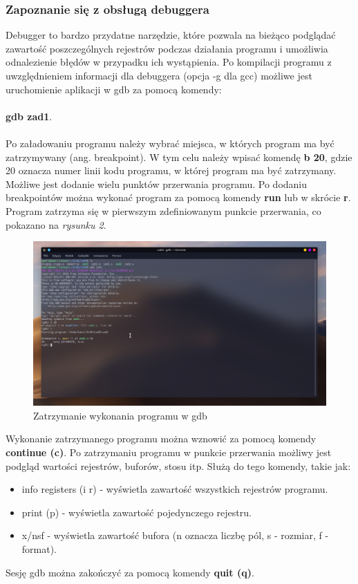 \documentclass[a4paper,12pt]{article}
\begin{document}
\subsubsection{Zapoznanie się z obsługą debuggera}
Debugger to bardzo przydatne narzędzie, które pozwala na bieżąco podglądać zawartość poszczególnych rejestrów podczas działania programu i umożliwia odnalezienie błędów w przypadku ich wystąpienia. Po kompilacji programu z uwzględnieniem informacji dla debuggera (opcja -g dla gcc) możliwe jest uruchomienie aplikacji w gdb za pomocą komendy:\\\\
\textbf{gdb zad1}.\\\\
Po załadowaniu programu należy wybrać miejsca, w których program ma być zatrzymywany (ang. breakpoint). W tym celu należy wpisać komendę \textbf{b 20}, gdzie 20 oznacza numer linii kodu programu, w której program ma być zatrzymany. Możliwe jest dodanie wielu punktów przerwania programu. Po dodaniu breakpointów można wykonać program za pomocą komendy \textbf{run} lub w skrócie \textbf{r}. Program zatrzyma się w pierwszym zdefiniowanym punkcie przerwania, co pokazano na \textit{rysunku 2}.
\begin{center}
	\begin{figure}[h]
		\centering\includegraphics[width=17cm]{Materialy/Lab0/gdb1}
		\caption{Zatrzymanie wykonania programu w gdb}
		\label{gdb1}
	\end{figure}
\end{center}
Wykonanie zatrzymanego programu można wznowić za pomocą komendy \textbf{continue (c)}. Po zatrzymaniu programu w punkcie przerwania możliwy jest podgląd wartości rejestrów, buforów, stosu itp. Służą do tego komendy, takie jak:
\begin{itemize}
	\item info registers (i r) - wyświetla zawartość wszystkich rejestrów programu.
	\item print (p) - wyświetla zawartość pojedynczego rejestru.
	\item x/nsf - wyświetla zawartość bufora (n oznacza liczbę pól, s - rozmiar, f - format).
\end{itemize}
Sesję gdb można zakończyć za pomocą komendy \textbf{quit (q)}.
\end{document}
